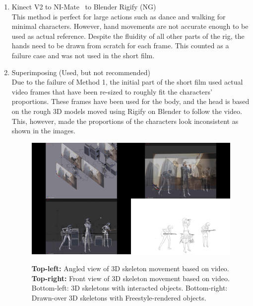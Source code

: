\begin{enumerate}
    \item Kinect V2 to NI-Mate~\cite{niMate} to Blender Rigify (NG)\\
    This method is perfect for large actions such as dance and walking for minimal characters. However, hand movements are not accurate enough to be used as actual reference. Despite the fluidity of all other parts of the rig, the hands need to be drawn from scratch for each frame. This counted as a failure case and was not used in the short film.

    \item Superimposing (Used, but not recommended)\\
        Due to the failure of Method 1, the initial part of the short film used actual video frames that have been re-sized to roughly fit the characters' proportions. These frames have been used for the body, and the head is based on the rough 3D models moved using Rigify on Blender to follow the video.\\
        This, however, made the proportions of the characters look inconsistent as shown in the images.

    \begin{figure}[t]
        \centering
        \includegraphics[width=1\linewidth]{img/results/process.pdf} \\
        \caption{\textbf{Top-left:} Angled view of 3D skeleton movement based on video. \textbf{Top-right:} Front view of 3D skeleton movement based on video. {Bottom-left:} 3D skeletons with interacted objects. {Bottom-right:} Drawn-over 3D skeletons with Freestyle-rendered objects.}
        \vspace{-15pt}
        \label{fig:process}
    \end{figure}


\end{enumerate}
